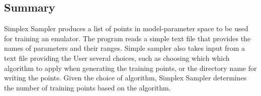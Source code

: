 \documentclass[main.tex]{subfiles}
\begin{document}
\begin{comment}
\newpage

3. {\tt Modelruns/} Directory

The Modelrun Directory includes the parameters and observables provided by the user in each run directory. It has two files: one for the model parameters with the parameter name and value, and another for the observable with its name, value, and uncertainty. These files are structured in the following manner.

\begin{table}[!h]
    \centering
    \begin{tabular}{c|c}
         Parameter Name & Value \\
         par1 & 96.472 \\
         par2 & 17.244 \\
         par3 & 29.456 \\
          \vdots & \vdots 
    \end{tabular}
    \caption{{\tt{mod\_parameters.txt}}}
    \label{tab:my_label}
\end{table}

\begin{table}[!h]
    \centering
    \begin{tabular}{c|c|c}
         Parameter Name & Value & Uncertainty\\
         length & 109.384 & 7.234\\
         mass & 58.34 & 2.59 \\
         time & 15.23 & 0.97 \\
          \vdots & \vdots & \vdots
    \end{tabular}
    \caption{{\tt{obs.txt}}}
    \label{tab:my_label}
\end{table} 

\subsection{Usage}
\label{sec:Usage}

The user is required to have some knowledge of C++ in order to write a routine program that calls methods from the software directory for their needs. Some example codes can be viewed in the template directory.


\end{comment}

\subsection{Summary}
Simplex Sampler produces a list of points in model-parameter space to be used for training an emulator. The program reads a simple text file that provides the names of parameters and their ranges. Simple sampler also takes input from a text file providing the User several choices, such as choosing which which algorithm to apply when generating the training points, or the directory name for writing the points. Given the choice of algorithm, Simplex Sampler determines the number of training points based on the algorithm.
\end{document}

